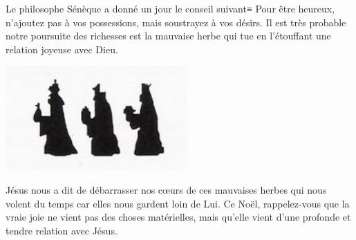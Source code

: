 Le philosophe Sénèque a donné un jour le conseil suivant≡ \og Pour être heureux, n'ajoutez pas à vos possessions, mais soustrayez à vos désirs. \fg{} Il est très probable notre poursuite des richesses est la mauvaise herbe qui tue en l'étouffant une relation joyeuse avec Dieu.

\mbox{}\hfill\includegraphics[height=4cm]{images/3kings.png}\hfill\mbox{}

Jésus nous a dit de débarrasser nos cœurs de ces mauvaises herbes qui nous volent du temps car elles nous gardent loin de Lui. Ce Noël, rappelez-vous que la vraie joie ne vient pas des choses matérielles, mais qu'elle vient d'une profonde et tendre relation avec Jésus.
\nopagebreak


\ornrule


